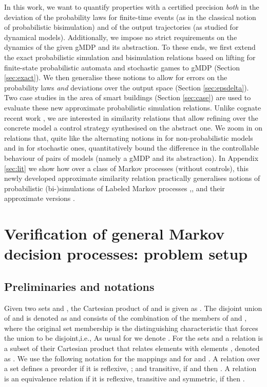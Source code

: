 \documentclass[letterpaper, 10 pt, conference]{amsart}
\theoremstyle{definition}
\theoremstyle{example}
\theoremstyle{remark}
\begin{document}
In this work,   
we want to quantify properties with a certified precision \emph{both} in the deviation of the probability laws for finite-time events (as in the classical notion of probabilistic bisimulation) and of the output trajectories (as studied for dynamical models).  
Additionally, we impose no strict requirements on the dynamics of the given gMDP and its abstraction. 
To these ends, 
we first extend the exact probabilistic simulation and bisimulation relations based on lifting for finite-state probabilistic automata and stochastic games \cite{Segala1995,Segala1995a,Zhang2010a} to gMDP (Section \ref{sec:exact}).  
We then generalise these notions to allow for errors on the probability laws \emph{and} deviations over the output space (Section \ref{sec:epsdelta}). 
Two case studies in the area of smart buildings (Section \ref{sec:case}) are used to evaluate these new approximate probabilistic simulation relations. 
Unlike cognate recent work \cite{Abate2011,Julius2009a}, 
we are interested in similarity relations that allow refining over the concrete model a control strategy synthesised on the abstract one. 
We zoom in on relations that, quite like the alternating notions in \cite{Alur1998,Tabuada2009b} for non-probabilistic models and in \cite{Zhang2010a} for stochastic ones, 
quantitatively bound the difference in the controllable behaviour of pairs of models (namely a gMDP and its abstraction).  
In Appendix \ref{sec:lit} we show how over a class 
of Markov processes (without controls), 
this newly developed approximate similarity relation practically generalises notions of probabilistic \mbox{(bi-)simulations} of Labeled Markov processes \cite[based on zigzag-morphisms]{Desharnais2002},\cite[based on equivalence relations]{Desharnais2003}, and  
 their  approximate versions \cite[based on binary relations]{desharnais2004metrics,Desharnais2008,cDAK12}. 
 

\section{Verification of general Markov decision processes: problem setup}  
\subsection{Preliminaries and notations} 
Given two sets  and ,  the Cartesian product of  and  is given as . 
The disjoint union of  and  is denoted as  and consists of the combination of the members of  and , where the original set membership is the distinguishing characteristic that forces the union to be disjoint,i.e.,  As usual for  we denote .
For the sets  and  a relation  is a subset of their Cartesian product that relates elements  with elements , denoted as .
We use the following notation for the mappings  and   for  and .
A relation over a set defines a preorder if it is reflexive, ; and transitive,  if  and  then . A relation  is an equivalence relation if it is reflexive, transitive and symmetric,  if  then .
 
\end{document}
